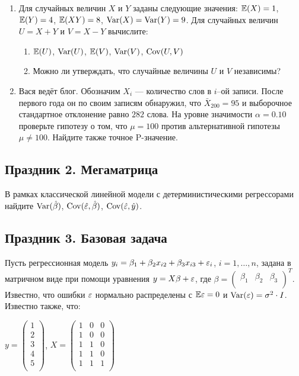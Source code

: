 \documentclass[12pt, a4paper]{article}
\begin{document}
\begin{enumerate}
\item Для случайных величин $X$ и $Y$ заданы следующие значения: $\mathbb{E}(X)=1$, $\mathbb{E}(Y)=4$, $\mathbb{E}(XY)=8$, $\operatorname{Var}(X)=\operatorname{Var}(Y)=9$. Для случайных величин $U=X+Y$ и $V=X-Y$ вычислите:
\begin{enumerate}
\item $\mathbb{E}(U)$, $\operatorname{Var}(U)$, $\mathbb{E}(V)$, $\operatorname{Var}(V)$, $\operatorname{Cov}(U,V)$
\item Можно ли утверждать, что случайные величины $U$ и $V$ независимы?
\end{enumerate}

\item Вася ведёт блог. Обозначим $X_i$ — количество слов в $i$--ой записи. После первого года он по своим записям обнаружил, что $\bar{X}_{200}=95$ и выборочное стандартное отклонение равно $282$ слова. На уровне значимости $\alpha=0.10$ проверьте гипотезу о том, что $\mu=100$ против альтернативной гипотезы $\mu\neq 100$. Найдите также точное P-значение.



\end{enumerate}

\subsection{Праздник 2. Мегаматрица}

В рамках классической линейной модели с детерминистическими регрессорами найдите $\operatorname{Var}(\hat{\beta})$, $\operatorname{Cov}(\hat{\varepsilon},\hat{\beta})$, $\operatorname{Cov}(\hat{\varepsilon},\hat{y})$.

\subsection{Праздник 3. Базовая задача}

Пусть регрессионная модель $y_i = \beta_1 + \beta_2 x_{i2} + \beta_3 x_{i3} + \varepsilon_i$, $i = 1, \ldots, n$, задана в матричном виде при помощи уравнения $y = X \beta + \varepsilon$, где $\beta =  \begin{pmatrix}
\beta_1 & \beta_2 & \beta_3\\
\end{pmatrix} ^T$. Известно, что ошибки $\varepsilon$ нормально распределены с $\mathbb{E} \varepsilon = 0$ и $\operatorname{Var} (\varepsilon) = \sigma^2 \cdot I$. Известно также, что:

$y =  \begin{pmatrix}
1 \\
2 \\
3 \\
4 \\
5 \\
\end{pmatrix} $, $X =  \begin{pmatrix}
1 & 0 & 0 \\
1 & 0 & 0 \\
1 & 1 & 0 \\
1 & 1 & 0 \\
1 & 1 & 1 \\
\end{pmatrix} $
\end{document}
